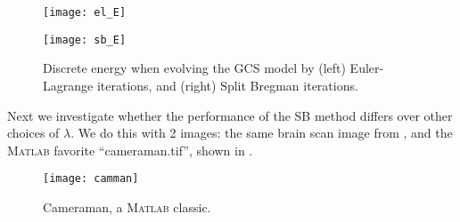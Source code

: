 \begin{figure}[htb!]
	\centering
	\begin{minipage}{0.40\textwidth}
		\texttt{[image: el\_E]}
	\end{minipage}\quad
	\begin{minipage}{0.40\textwidth}
		\texttt{[image: sb\_E]}
	\end{minipage}%
	\caption{Discrete energy when evolving the GCS model by (left) Euler-Lagrange iterations, and (right) Split Bregman iterations.}
	\label{fig:sb_energy}
\end{figure}

Next we investigate whether the performance of the SB method differs over other choices of $\lambda$. We do this with 2 images: the same brain scan image from , and the \textsc{Matlab} favorite ``cameraman.tif'', shown in .
\begin{figure}[htb!]
	\centering
	\begin{minipage}{0.40\textwidth}
		\texttt{[image: camman]}
	\end{minipage}\quad
	\caption{Cameraman, a \textsc{Matlab} classic.}
	\label{fig:cam}
\end{figure}
